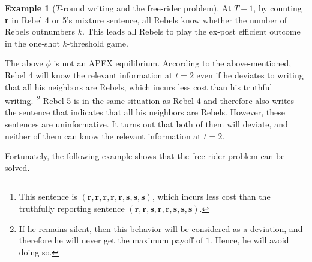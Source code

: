 \documentclass[12pt,letter]{article}
\newcommand\omicron{o}
\theoremstyle{definition}
\newtheorem{example}{Example}
\theoremstyle{remark}
\theoremstyle{claim}
\begin{document}
\begin{example}[$T$-round writing and the free-rider problem]
At $T+1$, by counting \textbf{r} in Rebel 4 or 5's mixture sentence, all Rebels know whether the number of Rebels outnumbers $k$. This leads all Rebels to play the ex-post efficient outcome in the one-shot $k$-threshold game. 

The above $\phi$ is not an APEX equilibrium. According to the above-mentioned, Rebel 4 will know the relevant information at $t=2$ even if he deviates to writing that all his neighbors are Rebels, which incurs less cost than his truthful writing.\footnote{This sentence is $(\textbf{r},\textbf{r},\textbf{r},\textbf{r},\textbf{r},\textbf{s},\textbf{s},\textbf{s})$, which incurs less cost than the truthfully reporting sentence $(\textbf{r},\textbf{r},\textbf{s},\textbf{r},\textbf{r},\textbf{s},\textbf{s},\textbf{s})$.}\footnote{If he remains silent, then this behavior will be considered as a deviation, and therefore he will never get the maximum payoff of $1$. Hence, he will avoid doing so.}
Rebel 5 is in the same situation as Rebel 4 and therefore also writes the sentence that indicates that all his neighbors are Rebels. However, these sentences are uninformative. It turns out that both of them will deviate, and neither of them can know the relevant information at $t=2$.


\end{example}

Fortunately, the following example shows that the free-rider problem can be solved. 
\end{document}
